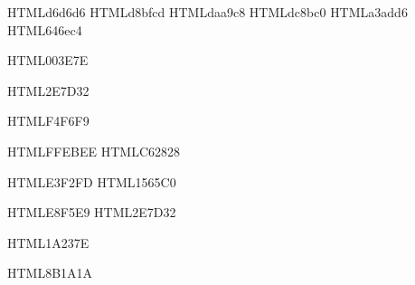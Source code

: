 %


\definecolor{tvwhite}	{HTML}{d6d6d6}
\definecolor{tvpink1}	{HTML}{d8bfcd}
\definecolor{tvpink2}	{HTML}{daa9c8}
\definecolor{tvpink3}	{HTML}{dc8bc0}
\definecolor{tvpurple1}	{HTML}{a3add6}
\definecolor{tvpurple2}	{HTML}{646ec4}

\definecolor{cppblue}  {HTML}{003E7E}

\definecolor{qtgreen}  {HTML}{2E7D32}

\definecolor{codebg}   {HTML}{F4F6F9}



\definecolor{warnbg}   {HTML}{FFEBEE}
\definecolor{warnfr}   {HTML}{C62828}

\definecolor{infobg}   {HTML}{E3F2FD}
\definecolor{infofr}   {HTML}{1565C0}

\definecolor{newbg}    {HTML}{E8F5E9}
\definecolor{newfr}    {HTML}{2E7D32}

\definecolor{linkblue} {HTML}{1A237E}

\definecolor{cmakered} {HTML}{8B1A1A}


